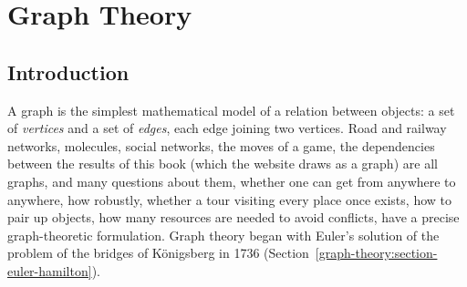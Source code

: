 \chapter{Graph Theory}\label{graph-theory}

\section{Introduction}\label{graph-theory:section-introduction}

A graph is the simplest mathematical model of a relation between objects: a set of \emph{vertices} and a set of \emph{edges}, each edge joining two vertices. Road and railway networks,
molecules, social networks, the moves of a game, the dependencies between the results of this book (which the website draws as a graph) are all graphs, and many questions about them,
whether one can get from anywhere to anywhere, how robustly, whether a tour visiting every place once exists, how to pair up objects, how many resources are needed to avoid conflicts,
have a precise graph-theoretic formulation. Graph theory began with Euler's solution of the problem of the bridges of K\"onigsberg in 1736 (Section~\ref{graph-theory:section-euler-hamilton}).

